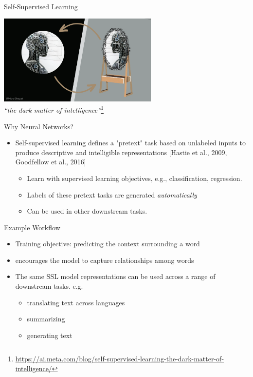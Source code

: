 \documentclass[serif, aspectratio=169]{beamer}
\begin{document}
\begin{frame}{Self-Supervised Learning}
    \begin{center}
        \includegraphics[width=0.6\textwidth]{pic/Intro.png} %
        \\[1cm] %
        \textit{“the dark matter of intelligence”}\footnote{\scriptsize \url{https://ai.meta.com/blog/self-supervised-learning-the-dark-matter-of-intelligence/}}
    \end{center}
\end{frame}

\begin{frame}{Why Neural Networks?}
    \begin{itemize}
        \item  Self-supervised learning defines a "pretext" task based on unlabeled inputs to produce descriptive and intelligible representations [Hastie et al., 2009, Goodfellow et al., 2016]
        \begin{itemize}
            \item Learn with supervised learning objectives, e.g., classification, regression.
	\item Labels of these pretext tasks are generated \textit{automatically}
	\item Can be used in other downstream tasks.
        \end{itemize}
    \end{itemize}
\end{frame}


\begin{frame}[t]{Example Workflow}
    
    \begin{itemize}
\item Training objective: predicting the context surrounding a word
\item encourages the model to capture relationships among words
\item The same SSL model representations can be used across a range
 of downstream tasks. e.g.
        \begin{itemize}
	\item translating text across languages
	\item summarizing
	\item generating text
        \end{itemize}
    \end{itemize}

\end{frame}
\end{document}
